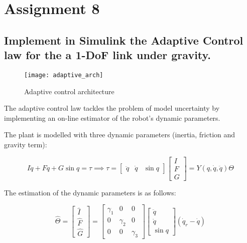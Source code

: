 \section{Assignment 8}

\subsection{Implement in Simulink the Adaptive Control law for the a 1-DoF link under gravity.}

\begin{figure}[H]
\centering
\texttt{[image: adaptive\_arch]}
\caption{Adaptive control architecture}
\end{figure}

The adaptive control law tackles the problem of model uncertainty by implementing an on-line estimator of the robot's dynamic parameters. 

The plant is modelled with three dynamic parameters (inertia, friction and gravity term):

\begin{equation*}
I\ddot q + F\dot q + G\sin q = \tau\implies \tau = \begin{bmatrix}
\ddot q & \dot q & \sin q
\end{bmatrix}\begin{bmatrix}
I\\ F\\ G
\end{bmatrix}=Y(q,\dot q,\ddot q)\Theta
\end{equation*}

The estimation of the dynamic parameters is as follows:

\begin{equation*}
\hat\Theta=\begin{bmatrix}
\hat I\\\hat F\\\hat G
\end{bmatrix}=\begin{bmatrix}
\gamma_1 & 0 & 0\\ 0 & \gamma_2 & 0\\ 0 & 0 & \gamma_3
\end{bmatrix}\begin{bmatrix}
\ddot q\\\dot q\\\sin q
\end{bmatrix}(\dot q_r-\dot q)
\end{equation*}

